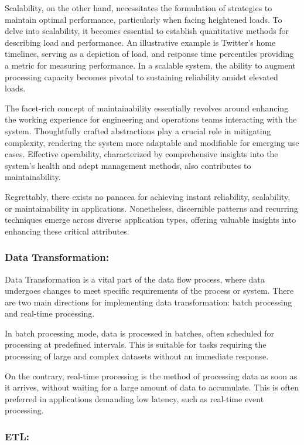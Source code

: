 Scalability, on the other hand, necessitates the formulation of strategies to maintain optimal performance, particularly when facing heightened loads. To delve into scalability, it becomes essential to establish quantitative methods for describing load and performance. An illustrative example is Twitter's home timelines, serving as a depiction of load, and response time percentiles providing a metric for measuring performance. In a scalable system, the ability to augment processing capacity becomes pivotal to sustaining reliability amidst elevated loads.

The facet-rich concept of maintainability essentially revolves around enhancing the working experience for engineering and operations teams interacting with the system. Thoughtfully crafted abstractions play a crucial role in mitigating complexity, rendering the system more adaptable and modifiable for emerging use cases. Effective operability, characterized by comprehensive insights into the system's health and adept management methods, also contributes to maintainability.

Regrettably, there exists no panacea for achieving instant reliability, scalability, or maintainability in applications. Nonetheless, discernible patterns and recurring techniques emerge across diverse application types, offering valuable insights into enhancing these critical attributes.

\subsubsection*{Data Transformation:}

Data Transformation is a vital part of the data flow process, where data undergoes changes to meet specific requirements of the process or system. There are two main directions for implementing data transformation: batch processing and real-time processing.

In batch processing mode, data is processed in batches, often scheduled for processing at predefined intervals. This is suitable for tasks requiring the processing of large and complex datasets without an immediate response.

On the contrary, real-time processing is the method of processing data as soon as it arrives, without waiting for a large amount of data to accumulate. This is often preferred in applications demanding low latency, such as real-time event processing.

\subsubsection*{ETL:}

